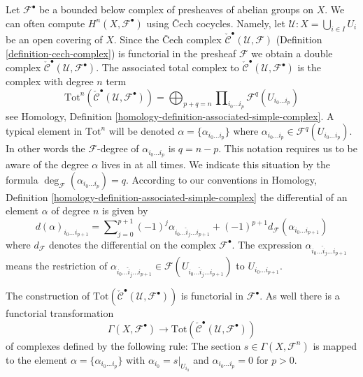 \medskip\noindent
Let ${\mathcal F}^\bullet$ be a bounded below complex of presheaves of abelian
groups on $X$. We can often compute $H^n(X, {\mathcal F}^\bullet)$
using {\v C}ech cocycles. Namely, let
${\mathcal U} : X = \bigcup_{i \in I} U_i$
be an open covering of $X$. Since the {\v C}ech complex
$\check{\mathcal{C}}^\bullet(\mathcal{U}, \mathcal{F})$
(Definition \ref{definition-cech-complex})
is functorial in the presheaf $\mathcal{F}$ we obtain a double complex
$\check{\mathcal{C}}^\bullet(\mathcal{U}, \mathcal{F}^\bullet)$.
The associated total complex to
$\check{\mathcal{C}}^\bullet({\mathcal U}, {\mathcal F}^\bullet)$
is the complex with degree $n$ term
$$
\text{Tot}^n(\check{\mathcal{C}}^\bullet({\mathcal U}, {\mathcal F}^\bullet))
=
\bigoplus\nolimits_{p + q = n}
\prod\nolimits_{i_0\ldots i_p} {\mathcal F}^q(U_{i_0\ldots i_p})
$$
see
Homology, Definition \ref{homology-definition-associated-simple-complex}.
A typical element in $\text{Tot}^n$ will be denoted
$\alpha = \{\alpha_{i_0\ldots i_p}\}$ where
$\alpha_{i_0 \ldots i_p} \in \mathcal{F}^q(U_{i_0\ldots i_p})$.
In other words the $\mathcal{F}$-degree of $\alpha_{i_0\ldots i_p}$ is
$q = n - p$. This notation requires us to be aware of the degree $\alpha$
lives in at all times. We indicate this situation by the formula
$\deg_{\mathcal F}(\alpha_{i_0\ldots i_p}) = q$.
According to our conventions in
Homology, Definition \ref{homology-definition-associated-simple-complex}
the differential of an element $\alpha$ of degree $n$ is given by
$$
d(\alpha)_{i_0\ldots i_{p + 1}}
=
\sum\nolimits_{j = 0}^{p + 1}
(-1)^j \alpha_{i_0 \ldots \hat i_j \ldots i_{p + 1}} +
(-1)^{p + 1}d_{{\mathcal F}}(\alpha_{i_0 \ldots i_{p + 1}})
$$
where $d_\mathcal{F}$ denotes the differential on the complex
$\mathcal{F}^\bullet$.
The expression $\alpha_{i_0 \ldots \hat i_j \ldots i_{p + 1}}$ means the
restriction of $\alpha_{i_0 \ldots \hat i_j \ldots i_{p + 1}}
\in {\mathcal F}(U_{i_0\ldots\hat i_j\ldots i_{p + 1}})$ to
$U_{i_0 \ldots i_{p + 1}}$.

\medskip\noindent
The construction of
$\text{Tot}(\check{\mathcal{C}}^\bullet({\mathcal U}, {\mathcal F}^\bullet))$
is functorial in ${\mathcal F}^\bullet$. As well there is a functorial
transformation
\begin{equation}
\label{equation-global-sections-to-cech}
\Gamma(X, {\mathcal F}^\bullet)
\longrightarrow
\text{Tot}(\check{\mathcal{C}}^\bullet({\mathcal U}, {\mathcal F}^\bullet))
\end{equation}
of complexes defined by the following rule: The section
$s\in \Gamma(X, {\mathcal F}^n)$
is mapped to the element $\alpha = \{\alpha_{i_0\ldots i_p}\}$
with $\alpha_{i_0} = s|_{U_{i_0}}$ and $\alpha_{i_0\ldots i_p} = 0$
for $p > 0$.

